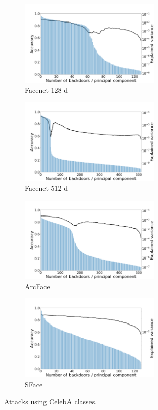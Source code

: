 \documentclass{article}
\theoremstyle{plain}
\theoremstyle{definition}
\theoremstyle{remark}
\begin{document}
\begin{figure}[t!]
    \centering
    \begin{subfigure}[t]{0.45\textwidth}
        \centering
        \includegraphics[height=1.6in]{figures/pca_attack_combo_Facenet_opencv_cosine_0.png}
        \caption{Facenet 128-d}
    \end{subfigure}%
    \hfill 
    \begin{subfigure}[t]{0.45\textwidth}
        \centering
        \includegraphics[height=1.6in]{figures/pca_attack_combo_Facenet512_opencv_cosine_0.png}
        \caption{Facenet 512-d}
    \end{subfigure}
    \hfill 
    \begin{subfigure}[t]{0.45\textwidth}
        \centering
        \includegraphics[height=1.6in]{figures/pca_attack_combo_ArcFace_opencv_cosine_0.png}
        \caption{ArcFace}
    \end{subfigure}
    \hfill 
    \begin{subfigure}[t]{0.45\linewidth}
        \centering
        \includegraphics[height=1.6in]{figures/pca_attack_combo_SFace_opencv_cosine_0.png}
        \caption{SFace}
    \end{subfigure}
    \caption{Attacks using CelebA classes.}
\end{figure}
\end{document}
